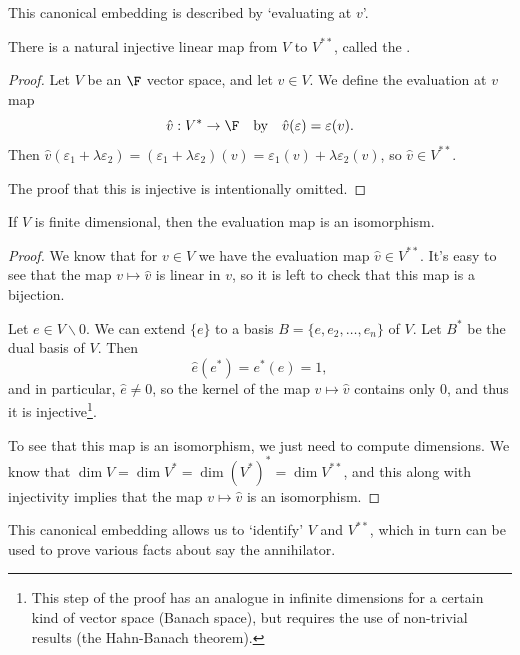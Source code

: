 \begin{center}
\begin{tikzpicture}[x=0.75pt,y=0.75pt,yscale=-1,xscale=1]
\end{tikzpicture}

\end{center}

This canonical embedding is described by `evaluating at $v$'.

\begin{theorem}
    There is a natural injective linear map from $V$ to $V^{**}$, called the .
\end{theorem}
\begin{proof}
Let $V$ be an $\F$ vector space, and let $v \in V$.
We define the evaluation at $v$ map
$$
\hat{v}: V^* \rightarrow \F \quad \text{by} \quad \hat{v}(\varepsilon) = \varepsilon(v).
$$
Then $\hat{v}(\varepsilon_1 + \lambda \varepsilon_2) = (\varepsilon_1 + \lambda \varepsilon_2)(v) = \varepsilon_1(v) + \lambda \varepsilon_2(v)$, so $\hat{v} \in V^{**}$.

The proof that this is injective is intentionally omitted.
\end{proof}


\begin{theorem}
    If $V$ is finite dimensional, then the evaluation map is an isomorphism.
\end{theorem}
\begin{proof}
    We know that for $v \in V$ we have the evaluation map $\hat{v} \in V^{**}$. It's easy to see that the map $v \mapsto \hat{v}$ is linear in $v$, so it is left to check that this map is a bijection.

    Let $e \in V \backslash {0}$. We can extend $\{e\}$ to a basis $B = \{e, e_2, \dots, e_n\}$ of $V$. Let $B^*$ be the dual basis of $V$. 
    Then
    $$
    \hat{e}(e^*) = e^*(e) = 1,
    $$
    and in particular, $\hat{e} \neq 0$, so the kernel of the map $v \mapsto \hat{v}$ contains only $0$, and thus it is injective\footnote{This step of the proof has an analogue in infinite dimensions for a certain kind of vector space (Banach space), but requires the use of non-trivial results (the Hahn-Banach theorem).}.

    To see that this map is an isomorphism, we just need to compute dimensions. We know that $\dim V = \dim V^* = \dim (V^*)^* = \dim V^{**}$, and this along with injectivity implies that the map $v \mapsto \hat{v}$ is an isomorphism.
\end{proof}

This canonical embedding allows us to `identify' $V$ and $V^{**}$, which in turn can be used to prove various facts about say the annihilator.

